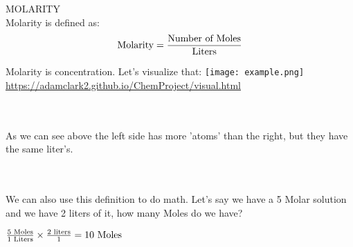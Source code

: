 \documentclass[14pt]{extarticle}
\begin{document}
    
    
    
    
    
    
    \pagebreak
    \flushleft
    \large MOLARITY \\
    \normalsize
    Molarity is defined as:
    $$ \text{Molarity} = {\text{Number of Moles} \over  \text{Liters}}$$
    
    Molarity is concentration. Let's visualize that:
    \texttt{[image: example.png]}
    \center \small \underline{\url{https://adamclark2.github.io/ChemProject/visual.html}}
    
    \flushleft
    \\~\\
    As we can see above the left side has more 'atoms' than the right, but they have the same liter's.
    
    \\~\\
    We can also use this definition to do math. Let's say we have a 5 Molar solution and we have 2 liters of it, how many Moles do we have? 
    
    \center
    ${5 \text{ Moles} \over 1 \text { Liters}} \times {2 \text{ liters} \over 1} = 10 \text{ Moles}$
    
\end{document}
